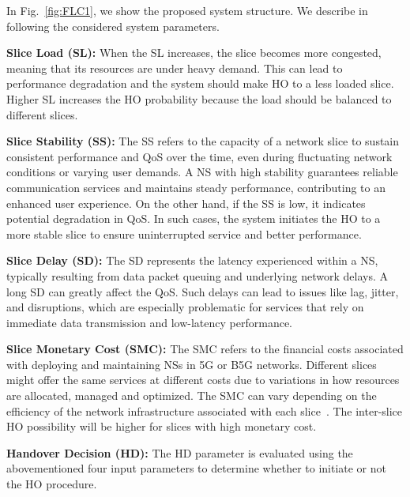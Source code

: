 \documentclass[graybox]{svmult}
\begin{document}
 
In Fig.~\ref{fig:FLC1}, we show the proposed system structure. We describe in following the considered system parameters.

\textbf{Slice Load (SL):} When the SL increases, the slice becomes more congested, meaning that its resources are under heavy demand. This can lead to performance degradation and the system should make
HO to a less loaded slice.  Higher SL increases the HO probability because the load should be balanced 
to different slices.  

\textbf{Slice Stability (SS):} The SS refers to the capacity of a network slice to sustain consistent performance and QoS over the time, even during fluctuating network conditions or varying user demands. A NS with high stability guarantees reliable communication services and maintains steady performance, contributing to an enhanced user experience. On the other hand, if the SS is low, it indicates potential degradation in QoS. In such cases, the system initiates the HO to a more stable slice to ensure uninterrupted service and better performance.

\textbf{Slice Delay (SD):} The SD represents the latency experienced within a NS, typically resulting from data packet queuing and underlying network delays. A long SD can greatly affect the QoS. Such delays can lead to issues like lag, jitter, and disruptions, which are especially problematic for services that rely on immediate data transmission and low-latency performance.

\textbf{Slice Monetary Cost (SMC):} The SMC refers to the financial costs associated with deploying and maintaining NSs in 5G or B5G networks. Different slices might offer the same services at different costs due to variations in how resources are allocated, managed and optimized. The SMC can vary depending on the efficiency of the network infrastructure associated with each slice~\cite{walia2021virtualization}. The inter-slice HO possibility will be higher for slices with high monetary cost. 

\textbf{Handover Decision (HD):} The HD parameter is evaluated using the abovementioned four input parameters to determine whether to initiate or not the HO procedure. 

\end{document}
